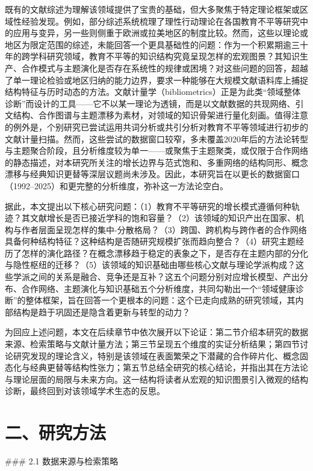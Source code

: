 \documentclass[12pt,a4paper]{article}
\begin{document}
既有的文献综述为理解该领域提供了宝贵的基础，但大多聚焦于特定理论框架或区域性经验发现。例如，部分综述系统梳理了理性行动理论在各国教育不平等研究中的应用与变异，另一些则侧重于欧洲或拉美地区的制度比较。然而，这些以理论或地区为限定范围的综述，未能回答一个更具基础性的问题：作为一个积累期逾三十年的跨学科研究领域，教育不平等的知识结构究竟呈现怎样的宏观图景？其知识生产、合作模式与主题演化是否存在系统性的规律或困境？对这些问题的回答，超越了单一理论检验或地区归纳的能力边界，要求一种能够在大规模文献语料库上捕捉结构特征与历时动态的方法。文献计量学（bibliometrics）正是为此类“领域整体诊断”而设计的工具——它不以某一理论为透镜，而是以文献数据的共现网络、引文结构、合作图谱与主题漂移为素材，对领域的知识骨架进行量化刻画。值得注意的例外是，个别研究已尝试运用共词分析或共引分析对教育不平等领域进行初步的文献计量扫描。然而，这些尝试的数据窗口较窄，多未覆盖2020年后的方法论转型与主题聚合阶段，且分析维度较为单一——或聚焦于主题聚类，或仅限于合作网络的静态描述，对本研究所关注的增长边界与范式饱和、多重网络的结构同形、概念漂移与经典知识更替等深层议题尚未涉及。因此，本研究旨在以更长的数据窗口（1992–2025）和更完整的分析维度，弥补这一方法论空白。

据此，本文提出以下核心研究问题：（1）教育不平等研究的增长模式遵循何种轨迹？其文献增长是否已接近学科的饱和容量？（2）该领域的知识产出在国家、机构与作者层面呈现怎样的集中-分散格局？（3）跨国、跨机构与跨作者的合作网络具备何种结构特征？这种结构是否随研究规模扩张而趋向整合？（4）研究主题经历了怎样的演化路径？在概念漂移趋于稳定的表象之下，是否存在主题内部的分化与隐性枢纽的迁移？（5）该领域的知识基础由哪些核心文献与理论学派构成？这些学派之间的关系是融合、竞争还是互补？这五个问题分别对应增长模型、产出分布、合作网络、主题演化与知识基础五个分析维度，共同勾勒出一个“领域健康诊断”的整体框架，旨在回答一个更根本的问题：这个已走向成熟的研究领域，其内部结构是趋于巩固还是隐含着更新与转型的动力？

为回应上述问题，本文在后续章节中依次展开以下论证：第二节介绍本研究的数据来源、检索策略与文献计量方法；第三节呈现五个维度的实证分析结果；第四节讨论研究发现的理论含义，特别是该领域在表面繁荣之下潜藏的合作碎片化、概念固态化与经典更替等结构性张力；第五节总结全研究的核心结论，并指出其在方法论与理论层面的局限与未来方向。这一结构将读者从宏观的知识图景引入微观的结构诊断，最终回到对该领域学术生态的反思。

\section{二、研究方法}

\#\#\# 2.1 数据来源与检索策略
\end{document}
